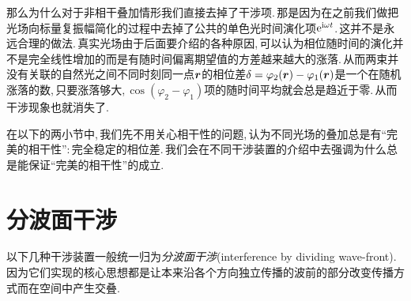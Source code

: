 那么为什么对于非相干叠加情形我们直接去掉了干涉项.\,那是因为在之前我们做把光场向标量复振幅简化的过程中去掉了公共的单色光时间演化项${\rm e} ^{{\rm i} \omega t}$.\,这并不是永远合理的做法.\,真实光场由于后面要介绍的各种原因,\,可以认为相位随时间的演化并不是完全线性增加的而是有随时间偏离期望值的方差越来越大的涨落.\,从而两束并没有关联的自然光之间不同时刻同一点$\boldsymbol{r}$的相位差$\delta=\varphi_2(\boldsymbol{r})-\varphi_1(\boldsymbol{r})$是一个在随机涨落的数,\,只要涨落够大,\,$\cos (\varphi_2-\varphi_1)$项的随时间平均就会总是趋近于零.\,从而干涉现象也就消失了.

在以下的两小节中,\,我们先不用关心相干性的问题,\,认为不同光场的叠加总是有``完美的相干性'':\,完全稳定的相位差.\,我们会在不同干涉装置的介绍中去强调为什么总是能保证``完美的相干性''的成立.




\section{分波面干涉}

以下几种干涉装置一般统一归为\emph{分波面干涉}(interference by dividing wave-front).\,因为它们实现的核心思想都是让本来沿各个方向独立传播的波前的部分改变传播方式而在空间中产生交叠.


